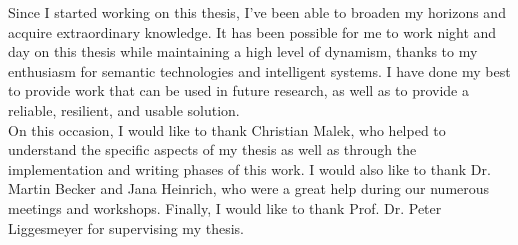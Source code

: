 
Since I started working on this thesis, I've been able to broaden my horizons and acquire extraordinary knowledge. It has been possible for me to work night and day on this thesis while maintaining a high level of dynamism, thanks to my enthusiasm for semantic technologies and intelligent systems. I have done my best to provide work that can be used in future research, as well as to provide a reliable, resilient, and usable solution.\\
On this occasion, I would like to thank Christian Malek, who helped to understand the specific aspects of my thesis as well as through the implementation and writing phases of this work. I would also like to thank Dr. Martin Becker and Jana Heinrich, who were a great help during our numerous meetings and workshops. Finally, I would like to thank Prof. Dr. Peter Liggesmeyer for supervising my thesis.

